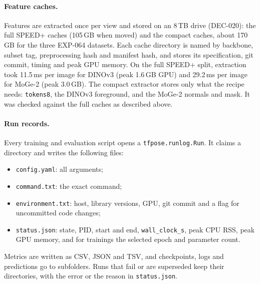 \paragraph{Feature caches.}
Features are extracted once per view and stored on an 8\,TB drive (DEC-020): the full SPEED+ caches (105\,GB when moved) and the compact caches, about 170\,GB for the three EXP-064 datasets. Each cache directory is named by backbone, subset tag, preprocessing hash and manifest hash, and stores its specification, git commit, timing and peak GPU memory.
On the full SPEED+ split, extraction took 11.5\,ms per image for DINOv3 (peak 1.6\,GB GPU) and 29.2\,ms per image for MoGe-2 (peak 3.0\,GB).
The compact extractor stores only what the recipe needs: \texttt{tokens8}, the DINOv3 foreground, and the MoGe-2 normals and mask. It was checked against the full caches as described above.

\paragraph{Run records.}
Every training and evaluation script opens a \texttt{tfpose.runlog.Run}. It claims a directory  and writes the following files:
\begin{itemize}
  \item \texttt{config.yaml}: all arguments;
  \item \texttt{command.txt}: the exact command;
  \item \texttt{environment.txt}: host, library versions, GPU, git commit and a flag for uncommitted code changes;
  \item \texttt{status.json}: state, PID, start and end, \texttt{wall\_clock\_s}, peak CPU RSS, peak GPU memory, and for trainings the selected epoch and parameter count.
\end{itemize}
Metrics are written as CSV, JSON and TSV, and checkpoints, logs and predictions go to subfolders. Runs that fail or are superseded keep their directories, with the error or the reason in \texttt{status.json}.

